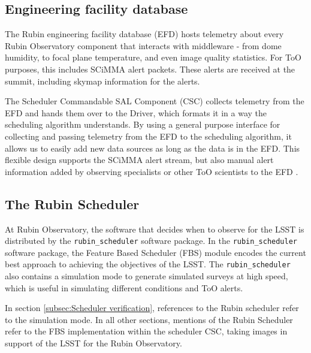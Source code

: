 \subsection{Engineering facility database}\label{subsec:EFD}

The Rubin engineering facility database (EFD) hosts telemetry about every Rubin Observatory component that interacts with middleware - from dome humidity, to focal plane temperature, and even image quality statistics. For ToO purposes, this includes SCiMMA alert packets. These alerts are received at the summit, including skymap information for the alerts.

The Scheduler Commandable SAL Component (CSC) collects telemetry from the EFD and hands them over to the Driver, which formats it in a way the scheduling algorithm understands. By using a general purpose interface for collecting and passing telemetry from the EFD to the scheduling algorithm, it allows us to easily add new data sources as long as the data is in the EFD. This flexible design supports the SCiMMA alert stream, but also manual alert information added by observing specialists or other ToO scientists to the EFD .

\subsection{The Rubin Scheduler}\label{subsec:Scheduler}

At Rubin Observatory, the software that decides when to observe for the LSST is distributed by the \verb|rubin_scheduler| software package. In the \verb|rubin_scheduler| software package, the Feature Based Scheduler (FBS) module encodes the current best approach to achieving the objectives of the LSST. The \verb|rubin_scheduler| also contains a simulation mode to generate simulated surveys at high speed, which is useful in simulating different conditions and ToO alerts.

In section \ref{subsec:Scheduler verification}, references to the Rubin scheduler refer to the simulation mode. In all other sections, mentions of the Rubin Scheduler refer to the FBS implementation within the scheduler CSC, taking images in support of the LSST for the Rubin Observatory.

